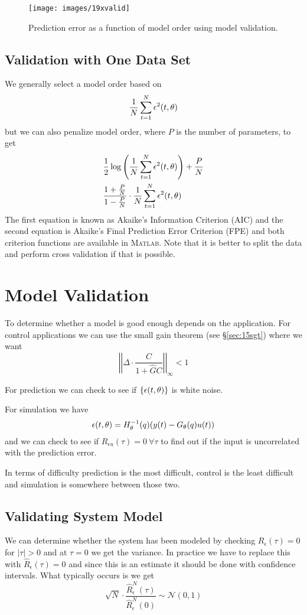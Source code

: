 \begin{figure}[ht!]
\centering
\texttt{[image: images/19xvalid]}
\caption{Prediction error as a function of model order using model validation.}
\label{fig:19xvalid}
\end{figure}

\subsection{Validation with One Data Set}
We generally select a model order based on
$$\frac{1}{N}\sum_{t=1}^N\epsilon^2(t,\theta)$$
but we can also penalize model order, where $P$ is the number of parameters, to get
\begin{align*}
&\frac{1}{2}\log\left(\frac{1}{N}\sum_{t=1}^N\epsilon^2(t,\theta)\right) + \frac{P}{N} \\
&\frac{1+\frac{P}{N}}{1-\frac{P}{N}}\cdot\frac{1}{N}\sum_{t=1}^N\epsilon^2(t,\theta)
\end{align*}
The first equation is known as Akaike's Information Criterion (AIC) and the second equation is Akaike's Final Prediction Error Criterion (FPE) and both criterion functions are available in \textsc{Matlab}.
Note that it is better to split the data and perform cross validation if that is possible.

\section{Model Validation}
To determine whether a model is good enough depends on the application.
For control applications we can use the small gain theorem (see \S\ref{sec:15sgt}) where we want
$$\left|\left|\Delta\cdot\frac{C}{1+\hat{G}C}\right|\right|_\infty < 1$$

For prediction we can check to see if $\{\epsilon(t,\theta)\}$ is white noise.

For simulation we have
$$\epsilon(t,\theta) = H_\theta^{-1}(q)(y(t)-G_\theta(q)u(t))$$
and we can check to see if $R_{\epsilon u}(\tau)=0~\forall \tau$ to find out if the input is uncorrelated with the prediction error.

In terms of difficulty prediction is the most difficult, control is the least difficult and simulation is somewhere between those two.

\subsection{Validating System Model}
We can determine whether the system has been modeled by checking $R_\epsilon(\tau)=0$ for $|\tau|>0$ and at $\tau=0$ we get the variance.
In practice we have to replace this with $\hat{R}_\epsilon(\tau)=0$ and since this is an estimate it should be done with confidence intervals.
What typically occurs is we get
$$\sqrt{N}\cdot\frac{\hat{R}_\epsilon^N(\tau)}{\hat{R}_\epsilon^N(0)} \sim \mathcal{N}(0,1)$$

